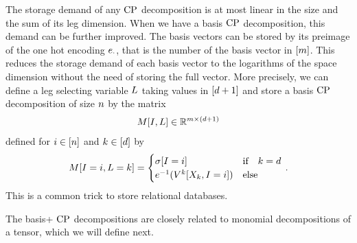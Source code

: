 \begin{remark}
    \label{rem:matStorageBas}
    The storage demand of any $\mathrm{CP}$ decomposition is at most linear in the size and the sum of its leg dimension.
    When we have a basis $\mathrm{CP}$ decomposition, this demand can be further improved.
    The basis vectors can be stored by its preimage of the one hot encoding $e_{\cdot}$, that is the number of the basis vector in $[m]$.
    This reduces the storage demand of each basis vector to the logarithms of the space dimension without the need of storing the full vector.
    More precisely, we can define a leg selecting variable $L$ taking values in $[d+1]$ and store a basis $\mathrm{CP}$ decomposition of size $n$ by the matrix
    \begin{align*}
        M[I,L] \in \mathbb{R}^{m \times (d+1)}
    \end{align*}
    defined for $i\in[n]$ and $k\in[d]$ by
    \begin{align*}
        \matrixat{\inddecvar,\selvariable=\atomenumerator} =
        \begin{cases}
            \scalarcoreat{\inddecvar} & \text{if} \quad \atomenumerator = \catorder \\
            \invonehotmapof{\legcoreofat{\atomenumerator}{\catvariableof{\atomenumerator},\indexeddecvariable}} & \text{else} \\%
        \end{cases} \, .
    \end{align*}
    This is a common trick to store relational databases.
\end{remark}



The basis+ $\mathrm{CP}$ decompositions are closely related to monomial decompositions of a tensor, which we will define next.

